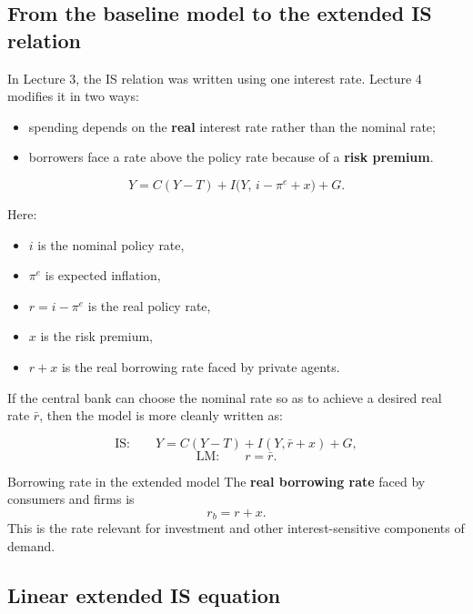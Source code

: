 \subsection{From the baseline model to the extended IS relation}

In Lecture 3, the IS relation was written using one interest rate. Lecture 4 modifies it in two ways:
\begin{itemize}[leftmargin=1.5em]
    \item spending depends on the \textbf{real} interest rate rather than the nominal rate;
    \item borrowers face a rate above the policy rate because of a \textbf{risk premium}.
\end{itemize}

\begin{keyformula}[title={Key Formula: Extended IS relation in nominal-rate form}]
\[
Y = C(Y-T) + I\bigl(Y,\, i-\pi^e + x\bigr) + G.
\]
\end{keyformula}

\noindent
Here:
\begin{itemize}[leftmargin=1.5em]
    \item $i$ is the nominal policy rate,
    \item $\pi^e$ is expected inflation,
    \item $r=i-\pi^e$ is the real policy rate,
    \item $x$ is the risk premium,
    \item $r+x$ is the real borrowing rate faced by private agents.
\end{itemize}

\noindent
If the central bank can choose the nominal rate so as to achieve a desired real rate $\bar r$, then the model is more cleanly written as:

\begin{keyformula}[title={Key Formula: Extended IS--LM system}]
\[
\text{IS:}\qquad
Y = C(Y-T) + I(Y,\bar r + x) + G,
\]
\[
\text{LM:}\qquad
r=\bar r.
\]
\end{keyformula}

\begin{definition}{Borrowing rate in the extended model}{}
The \textbf{real borrowing rate} faced by consumers and firms is
\[
r_b = r+x.
\]
This is the rate relevant for investment and other interest-sensitive components of demand.
\end{definition}

\subsection{Linear extended IS equation}

